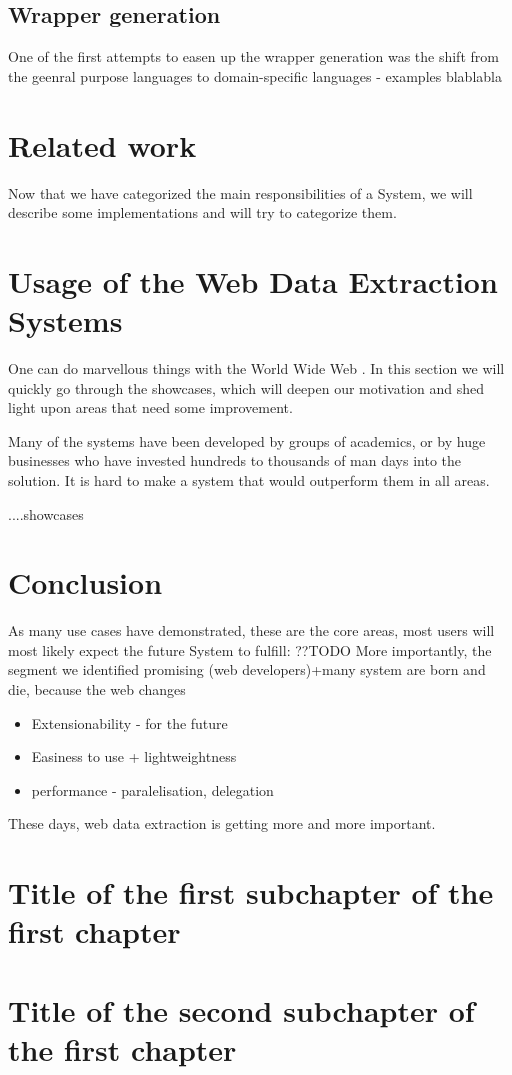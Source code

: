 \subsection{Wrapper generation}
One of the first attempts to easen up the wrapper generation was the shift from the geenral purpose languages to domain-specific languages
- examples blablabla


\section{Related work}
Now that we have categorized the main responsibilities of a System, we will describe some implementations and will try to categorize them.




\section{Usage of the Web Data Extraction Systems}
One can do marvellous things with the World Wide Web \cite{brin1998can}.
In this section we will quickly go through the showcases, which will deepen our motivation and shed light upon areas that need some improvement.

Many of the systems have been developed by groups of academics, or by huge businesses who have invested hundreds to thousands of man days into the solution. It is hard to make a system that would outperform them in all areas.

....showcases


\section{Conclusion}
As many use cases have demonstrated, these are the core areas, most users will most likely expect the future System to fulfill:
??TODO More importantly, the segment we identified promising (web developers)+many system are born and die, because the web changes

\begin{itemize}
    \item Extensionability - for the future
    \item Easiness to use + lightweightness
    \item performance - paralelisation, delegation
\end{itemize}



These days, web data extraction is getting more and more important.
\section{Title of the first subchapter of the first chapter}

\section{Title of the second subchapter of the first chapter}
